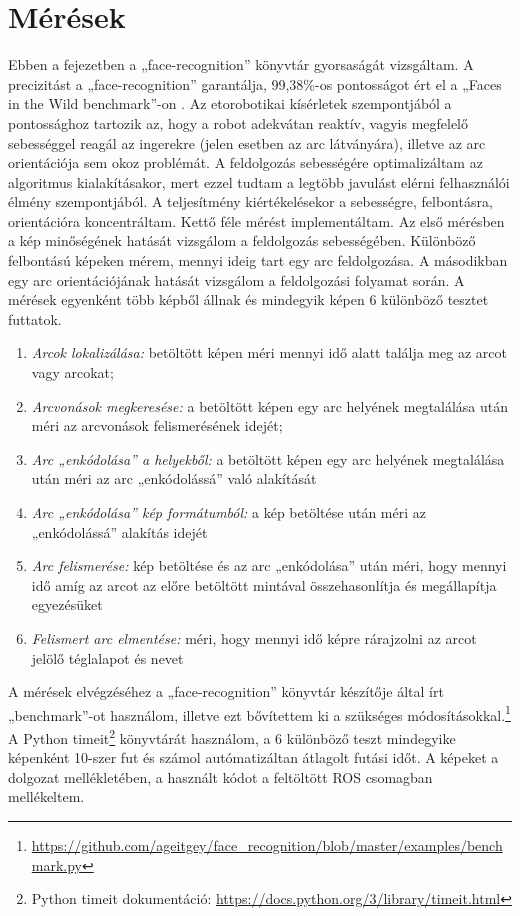 
\chapter{Mérések}
\label{sec:meresek}

Ebben a fejezetben a „face-recognition” könyvtár gyorsaságát vizsgáltam. A precizitást a „face-recognition” garantálja, 99,38\%-os pontosságot ért el a „Faces in the Wild benchmark”-on \cite{artc31}. Az etorobotikai kísérletek szempontjából a pontossághoz tartozik az, hogy a robot adekvátan reaktív, vagyis megfelelő sebességgel reagál az ingerekre (jelen esetben az arc látványára), illetve az arc orientációja sem okoz problémát. A feldolgozás sebességére optimalizáltam az algoritmus kialakításakor, mert ezzel tudtam a legtöbb javulást elérni felhasználói élmény szempontjából. A teljesítmény kiértékelésekor a sebességre, felbontásra, orientációra koncentráltam. Kettő féle mérést implementáltam. Az első mérésben a kép minőségének hatását vizsgálom a feldolgozás sebességében. Különböző felbontású képeken mérem, mennyi ideig tart egy arc feldolgozása. A másodikban egy arc orientációjának hatását vizsgálom a feldolgozási folyamat során. A mérések egyenként több képből állnak és mindegyik képen 6 különböző tesztet futtatok.
\begin{enumerate}
    \item \emph{Arcok lokalizálása:} betöltött képen méri mennyi idő alatt találja meg az arcot vagy arcokat;
    \item \emph{Arcvonások megkeresése:} a betöltött képen egy arc helyének megtalálása után méri az arcvonások felismerésének idejét;
    \item \emph{Arc „enkódolása” a helyekből:} a betöltött képen egy arc helyének megtalálása után méri az arc „enkódolássá” való alakítását
    \item \emph{Arc „enkódolása” kép formátumból:} a kép betöltése után méri az „enkódolássá” alakítás idejét
    \item \emph{Arc felismerése:} kép betöltése és az arc „enkódolása” után méri, hogy mennyi idő amíg az arcot az előre betöltött mintával összehasonlítja és megállapítja egyezésüket
    \item \emph{Felismert arc elmentése:} méri, hogy mennyi idő képre rárajzolni az arcot jelölő téglalapot és nevet
\end{enumerate}

A mérések elvégzéséhez a „face-recognition” könyvtár készítője által írt „benchmark”-ot használom, illetve ezt bővítettem ki a szükséges módosításokkal.\footnote{\url{https://github.com/ageitgey/face_recognition/blob/master/examples/benchmark.py}} A Python timeit\footnote{Python timeit dokumentáció: \url{https://docs.python.org/3/library/timeit.html}} könyvtárát használom, a 6 különböző teszt mindegyike képenként 10-szer fut és számol autómatizáltan átlagolt futási időt. A képeket a dolgozat mellékletében, a használt kódot a feltöltött ROS csomagban mellékeltem.

